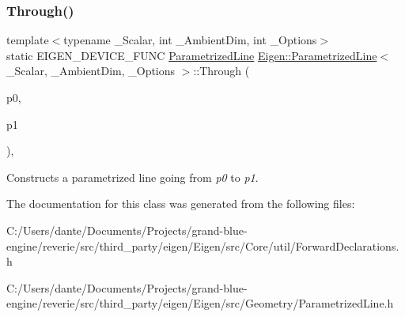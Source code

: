 \subsubsection{\texorpdfstring{Through()}{Through()}}
{\footnotesize\ttfamily template$<$typename \+\_\+\+Scalar, int \+\_\+\+Ambient\+Dim, int \+\_\+\+Options$>$ \\
static E\+I\+G\+E\+N\+\_\+\+D\+E\+V\+I\+C\+E\+\_\+\+F\+U\+NC \mbox{\hyperlink{class_eigen_1_1_parametrized_line}{Parametrized\+Line}} \mbox{\hyperlink{class_eigen_1_1_parametrized_line}{Eigen\+::\+Parametrized\+Line}}$<$ \+\_\+\+Scalar, \+\_\+\+Ambient\+Dim, \+\_\+\+Options $>$\+::Through (\begin{DoxyParamCaption}\item[{const \mbox{\hyperlink{class_eigen_1_1_matrix}{Vector\+Type}} \&}]{p0,  }\item[{const \mbox{\hyperlink{class_eigen_1_1_matrix}{Vector\+Type}} \&}]{p1 }\end{DoxyParamCaption})\hspace{0.3cm}{\ttfamily [inline]}, {\ttfamily [static]}}

Constructs a parametrized line going from {\itshape p0} to {\itshape p1}. 

The documentation for this class was generated from the following files\+:\begin{DoxyCompactItemize}
\item 
C\+:/\+Users/dante/\+Documents/\+Projects/grand-\/blue-\/engine/reverie/src/third\+\_\+party/eigen/\+Eigen/src/\+Core/util/Forward\+Declarations.\+h\item 
C\+:/\+Users/dante/\+Documents/\+Projects/grand-\/blue-\/engine/reverie/src/third\+\_\+party/eigen/\+Eigen/src/\+Geometry/Parametrized\+Line.\+h\end{DoxyCompactItemize}
